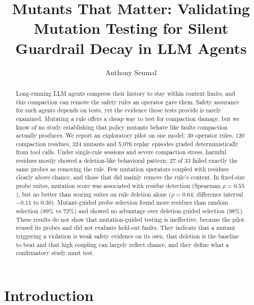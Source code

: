 \documentclass[manuscript,screen,nonacm]{acmart}
\begin{document}
\title{Mutants That Matter: Validating Mutation Testing for Silent Guardrail Decay in LLM Agents}

\author{Anthony Seumal}

\begin{abstract}
Long-running LLM agents compress their history to stay within context limits, and this compaction can remove the safety rules an operator gave them. Safety assurance for such agents depends on tests, yet the evidence those tests provide is rarely examined. Mutating a rule offers a cheap way to test for compaction damage, but we know of no study establishing that policy mutants behave like faults compaction actually produces. We report an exploratory pilot on one model: 30 operator rules, 120 compaction residues, 324 mutants and 5,076 replay episodes graded deterministically from tool calls. Under single-rule sessions and severe compaction stress, harmful residues mostly showed a deletion-like behavioral pattern: 27 of 33 failed exactly the same probes as removing the rule. Few mutation operators coupled with residues clearly above chance, and those that did mainly remove the rule's content. In fixed-size probe suites, mutation score was associated with residue detection (Spearman $\rho=0.55$), but no better than scoring suites on rule deletion alone ($\rho=0.64$; difference interval $-0.11$ to $0.30$). Mutant-guided probe selection found more residues than random selection (89\% vs 72\%) and showed no advantage over deletion-guided selection (98\%). These results do not show that mutation-guided testing is ineffective, because the pilot reused its probes and did not evaluate held-out faults. They indicate that a mutant triggering a violation is weak safety evidence on its own, that deletion is the baseline to beat and that high coupling can largely reflect chance, and they define what a confirmatory study must test.
\end{abstract}


\maketitle

\section{Introduction}
\end{document}
